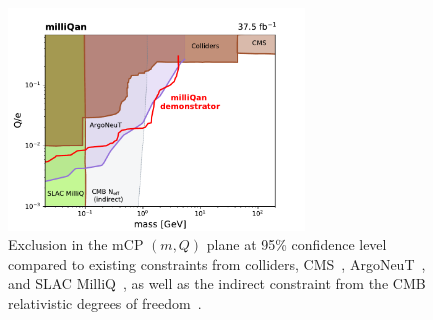 \clearpage
\begin{figure}[t]
  \begin{center}
    \includegraphics[width=0.70\textwidth]{figs/milliq/finalLimit.pdf}
    \caption{Exclusion in the mCP $(m,Q)$ plane at 95\% confidence level compared
      to existing constraints from colliders, CMS~\cite{Chatrchyan_2013,Chatrchyan_2013_2}, ArgoNeuT~\cite{ArgoNeuT}, and SLAC MilliQ~\cite{MilliQ},
      as well as the indirect constraint from the CMB relativistic degrees of freedom~\cite{Brust:2013ova}.
            }
    \label{fig:mq_limit}
  \end{center}
\end{figure}
\vphantom{100mm}
